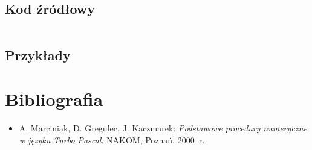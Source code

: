 \documentclass[12pt]{article}
\begin{document}
		\subsection{Kod źródłowy}
			\inputminted[firstline=6, lastline=40]{c++}{../solvers/secant.cpp}

		\subsection{Przykłady}

	\section{Bibliografia}
		\begin{itemize}
		  \item A. Marciniak, D. Gregulec, J. Kaczmarek: \textsl{Podstawowe procedury numeryczne w języku Turbo Pascal}. NAKOM, Poznań, 2000~r.
		\end{itemize}
\end{document}
